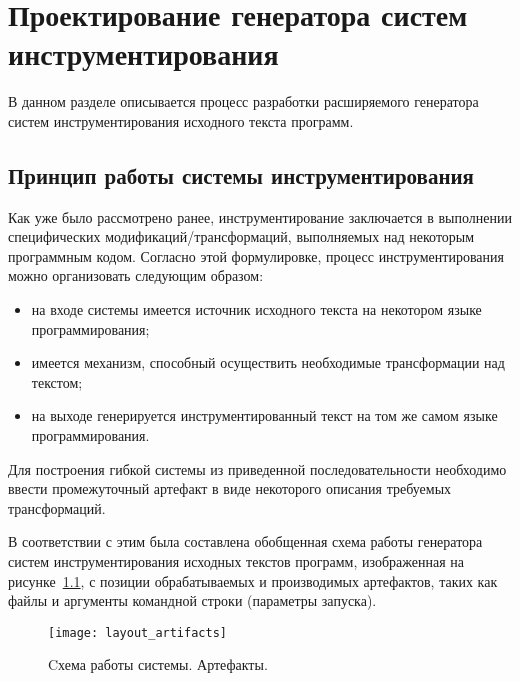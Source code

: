 \chapter{Проектирование генератора систем инструментирования}

В данном разделе описывается процесс разработки расширяемого генератора систем инструментирования исходного текста программ.

\section{Принцип работы системы инструментирования}

Как уже было рассмотрено ранее, инструментирование заключается в выполнении специфических модификаций/трансформаций, выполняемых над некоторым программным кодом.
Согласно этой формулировке, процесс инструментирования можно организовать следующим образом:
\begin{itemize}[noitemsep]
  \item на входе системы имеется источник исходного текста на некотором языке программирования;
  \item имеется механизм, способный осуществить необходимые трансформации над текстом;
  \item на выходе генерируется инструментированный текст на том же самом языке программирования.
\end{itemize}

Для построения гибкой системы из приведенной последовательности необходимо ввести промежуточный артефакт в виде некоторого описания требуемых трансформаций.

В соответствии с этим была составлена обобщенная схема работы генератора систем инструментирования исходных текстов программ, изображенная на рисунке~\ref{fig:layout_artifacts}, с позиции обрабатываемых и производимых артефактов, таких как файлы и аргументы командной строки (параметры запуска).

\begin{figure}[!h]
	\centering
	\texttt{[image: layout\_artifacts]}
	\caption{Cхема работы системы. Артефакты.}
	\label{fig:layout_artifacts}
\end{figure}

